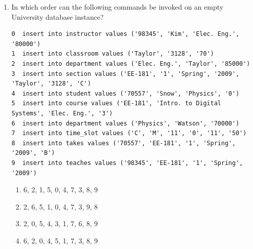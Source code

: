 \documentclass{article}
\begin{document}
\begin{enumerate}
  \item In which order can the following commands be invoked on an empty University database instance?

\begin{verbatim}
0  insert into instructor values ('98345', 'Kim', 'Elec. Eng.', '80000')
1  insert into classroom values ('Taylor', '3128', '70')
2  insert into department values ('Elec. Eng.', 'Taylor', '85000')
3  insert into section values ('EE-181', '1', 'Spring', '2009', 'Taylor', '3128', 'C')
4  insert into student values ('70557', 'Snow', 'Physics', '0')
5  insert into course values ('EE-181', 'Intro. to Digital Systems', 'Elec. Eng.', '3')
6  insert into department values ('Physics', 'Watson', '70000')
7  insert into time_slot values ('C', 'M', '11', '0', '11', '50')
8  insert into takes values ('70557', 'EE-181', '1', 'Spring', '2009', 'B')
9  insert into teaches values ('98345', 'EE-181', '1', 'Spring', '2009')
\end{verbatim}

  \begin{enumerate}
    \item[(A)] 6, 2, 1, 5, 0, 4, 7, 3, 8, 9
    \item[(B)] 2, 6, 5, 1, 0, 4, 7, 3, 9, 8
    \item[(C)] 2, 0, 5, 4, 3, 1, 7, 6, 8, 9
    \item[(D)] 6, 2, 0, 4, 5, 1, 7, 3, 8, 9
  \end{enumerate}

\end{enumerate}
\end{document}
